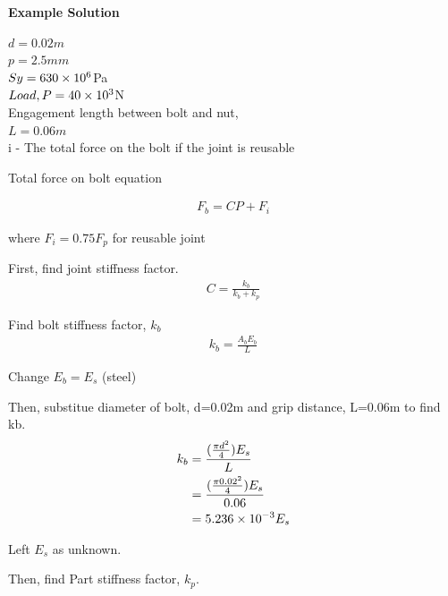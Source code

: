 \documentclass[a4paper, fleqn]{article}
\providecommand{\sci}[1]{\protect\ensuremath{\times 10^{\StrSubstitute[0]{#1}{e}{}}}}
\begin{document}
\vspace{10pt}
\textbf{Example Solution}
\vspace{10pt}

$d = 0.02m$\\
$p = 2.5mm$\\
$Sy=630\sci{e6}$Pa\\
$Load,P = 40\sci{e3}$N\\
Engagement length between bolt and nut,\\
$L = 0.06m$\\

i - The total force on the bolt if the joint is reusable

Total force on bolt equation

\begin{equation}
    \begin{aligned}
    F_b=CP+F_i
    \end{aligned}
\end{equation}

where $F_i=0.75F_p$ for reusable joint

First, find joint stiffness factor.
\begin{equation}
    \begin{aligned}
    C=\frac{k_b}{k_b+k_p}
    \end{aligned}
\end{equation}

Find bolt stiffness factor, $k_b$
\begin{equation}
    \begin{aligned}
    k_b=\frac{A_bE_b}{L}
    \end{aligned}
\end{equation}

Change $E_b=E_s$ (steel)

Then, substitue diameter of bolt, d=0.02m and grip distance, L=0.06m to find kb.
\begin{equation*}
    \begin{aligned}
    k_b&=\frac{(\frac{\pi d^2}{4})E_s}{L} \\
    &=\frac{(\frac{\pi 0.02^2}{4})E_s}{0.06} \\
    &= 5.236\sci{e-3}E_s
    \end{aligned}
\end{equation*}

Left $E_s$ as unknown.
\vspace{10pt}

Then, find Part stiffness factor, $k_p$.
\end{document}
